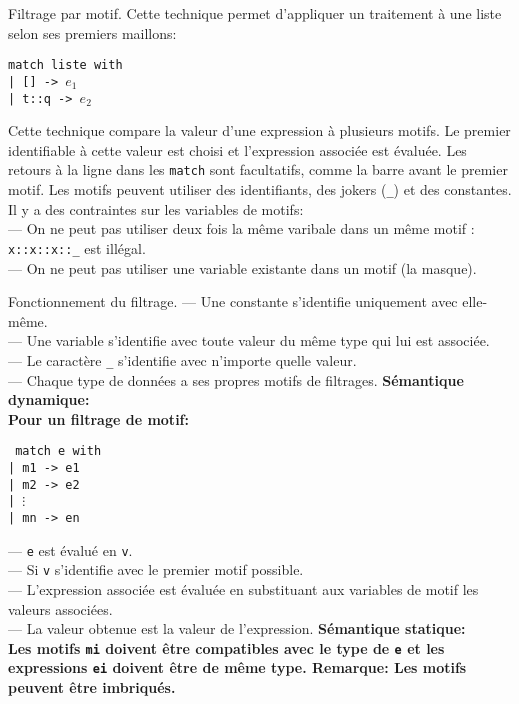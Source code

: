 \documentclass[french, 11pt]{article}
\begin{document}
\begin{defi}{Filtrage par motif.}{}
    Cette technique permet d'appliquer un traitement à une liste selon ses premiers maillons:
    \begin{center}
        \texttt{match liste with\\
        \hspace{-1.3cm}| [] -> $e_1$\\
        \hspace{-0.9cm}| t::q -> $e_2$
        }
    \end{center}
    Cette technique compare la valeur d'une expression à plusieurs motifs. Le premier identifiable à cette valeur est choisi et l'expression associée est évaluée.\n
    Les retours à la ligne dans les \texttt{match} sont facultatifs, comme la barre avant le premier motif.\n
    Les motifs peuvent utiliser des identifiants, des jokers (\texttt{\_}) et des constantes. Il y a des contraintes sur les variables de motifs:\\
    --- On ne peut pas utiliser deux fois la même varibale dans un même motif : \texttt{x::x::x::\_} est illégal.\\
    --- On ne peut pas utiliser une variable existante dans un motif (la masque).
\end{defi}

\begin{defi}{Fonctionnement du filtrage.}{}
    --- Une constante s'identifie uniquement avec elle-même.\\
    --- Une variable s'identifie avec toute valeur du même type qui lui est associée.\\
    --- Le caractère \texttt{\_} s'identifie avec n'importe quelle valeur.\\
    --- Chaque type de données a ses propres motifs de filtrages.\n
    \bf{Sémantique dynamique:}\\
    Pour un filtrage de motif:
    \begin{addmargin}[2em]{1em}
        \texttt{
            match e with\\
            \hspace*{0.1cm}| m1 -> e1\\
            \hspace*{0.1cm}| m2 -> e2\\
            \hspace*{0.1cm}| $\vdots$\\
            \hspace*{0.1cm}| mn -> en
        }
    \end{addmargin}
    --- \texttt{e} est évalué en \texttt{v}.\\
    --- Si \texttt{v} s'identifie avec le premier motif possible.\\
    --- L'expression associée est évaluée en substituant aux variables de motif les valeurs associées.\\
    --- La valeur obtenue est la valeur de l'expression.\n
    \bf{Sémantique statique:}\\
    Les motifs \texttt{mi} doivent être compatibles avec le type de \texttt{e} et les expressions \texttt{ei} doivent être de même type.\n
    \bf{Remarque:} Les motifs peuvent être imbriqués.
\end{defi}
\end{document}
